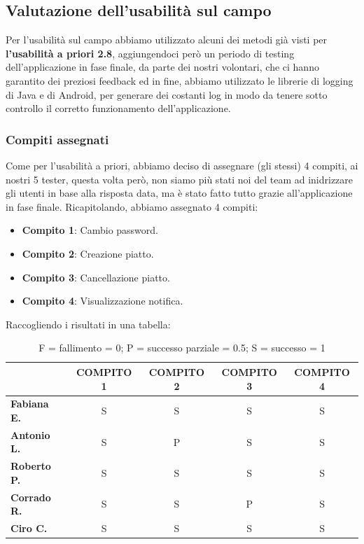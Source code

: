 \subsection{Valutazione dell'usabilità sul campo}
Per l'usabilità sul campo abbiamo utilizzato alcuni dei metodi già visti per \textbf{l'usabilità a priori 2.8}, aggiungendoci però un periodo di testing dell'applicazione in fase finale, da parte dei nostri volontari, che ci hanno garantito dei preziosi feedback ed in fine, abbiamo utilizzato le librerie di logging di Java e di Android, per generare dei costanti log in modo da tenere sotto controllo il corretto funzionamento dell'applicazione.
\subsubsection{Compiti assegnati}
Come per l'usabilità a priori, abbiamo deciso di assegnare (gli stessi) 4 compiti, ai nostri 5 tester, questa volta però, non siamo più stati noi del team ad inidrizzare gli utenti in base alla risposta data, ma è stato fatto tutto grazie all'applicazione in fase finale. Ricapitolando, abbiamo assegnato 4 compiti:
\begin{itemize}
  \item \textbf{Compito 1}: Cambio password.
  \item \textbf{Compito 2}: Creazione piatto.
  \item \textbf{Compito 3}: Cancellazione piatto.
  \item \textbf{Compito 4}: Visualizzazione notifica.
\end{itemize}
Raccogliendo i risultati in una tabella:
\begin{table}[H]
  \begin{center}
    \def\arraystretch{1.5}
    \begin{tabular}{|l|c|c|c|c|}
      \hline
                          & \textbf{COMPITO 1} & \textbf{COMPITO 2} & \textbf{COMPITO 3} & \textbf{COMPITO 4} \\
      \hline
      \textbf{Fabiana E.} & S                  & S                  & S                  & S                  \\
      \hline
      \textbf{Antonio L.} & S                  & P                  & S                  & S                  \\
      \hline
      \textbf{Roberto P.} & S                  & S                  & S                  & S                  \\
      \hline
      \textbf{Corrado R.} & S                  & S                  & P                  & S                  \\
      \hline
      \textbf{Ciro C.}    & S                  & S                  & S                  & S                  \\
      \hline
    \end{tabular}
  \end{center}
  \caption{F = fallimento = 0; P = successo parziale = 0.5; S = successo = 1}
\end{table}
